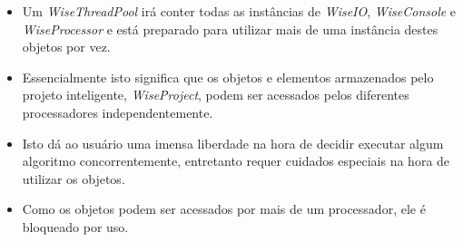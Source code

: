 \documentclass[10pt]{beamer}
\theoremstyle{remark}
\theoremstyle{definition}
\begin{document}
\begin{frame}[allowframebreaks]
\begin{center}
		\end{center}
		
		\framebreak
		
		\begin{itemize}
			\item Um \textit{WiseThreadPool} irá conter todas as instâncias de \textit{WiseIO}, \textit{WiseConsole} e \textit{WiseProcessor} e está preparado para utilizar mais de uma instância destes objetos por vez.
			\item Essencialmente isto significa que os objetos e elementos armazenados pelo projeto inteligente, \textit{WiseProject}, podem ser acessados pelos diferentes processadores independentemente.
			
			\item Isto dá ao usuário uma imensa liberdade na hora de decidir executar algum algoritmo concorrentemente, entretanto requer cuidados especiais na hora de utilizar os objetos.
			
			\item Como os objetos podem ser acessados por mais de um processador, ele é bloqueado por uso.
		\end{itemize}
		
	\end{frame}
	
\end{document}
